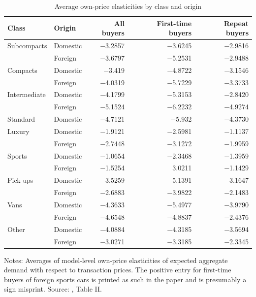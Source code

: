 \begin{table}[htbp]
\centering
\caption{Average own-price elasticities by class and origin}
\label{tab:08-gold-elas}
\footnotesize
\begin{tabular}{@{}llrrr@{}}
\toprule
Class & Origin & All buyers & First-time buyers & Repeat buyers \\
\midrule
Subcompacts & Domestic & $-$3.2857 & $-$3.6245 & $-$2.9816 \\
 & Foreign & $-$3.6797 & $-$5.2531 & $-$2.9488 \\
Compacts & Domestic & $-$3.419 & $-$4.8722 & $-$3.1546 \\
 & Foreign & $-$4.0319 & $-$5.7229 & $-$3.3733 \\
Intermediate & Domestic & $-$4.1799 & $-$5.3153 & $-$2.8420 \\
 & Foreign & $-$5.1524 & $-$6.2232 & $-$4.9274 \\
Standard & Domestic & $-$4.7121 & $-$5.932 & $-$4.3730 \\
Luxury & Domestic & $-$1.9121 & $-$2.5981 & $-$1.1137 \\
 & Foreign & $-$2.7448 & $-$3.1272 & $-$1.9959 \\
Sports & Domestic & $-$1.0654 & $-$2.3468 & $-$1.3959 \\
 & Foreign & $-$1.5254 & 3.0211 & $-$1.1429 \\
Pick-ups & Domestic & $-$3.5259 & $-$5.1391 & $-$3.1647 \\
 & Foreign & $-$2.6883 & $-$3.9822 & $-$2.1483 \\
Vans & Domestic & $-$4.3633 & $-$5.4977 & $-$3.9790 \\
 & Foreign & $-$4.6548 & $-$4.8837 & $-$2.4376 \\
Other & Domestic & $-$4.0884 & $-$4.3185 & $-$3.5694 \\
 & Foreign & $-$3.0271 & $-$3.3185 & $-$2.3345 \\
\bottomrule
\end{tabular}

\smallskip
\begin{minipage}{0.86\linewidth}
\footnotesize Notes: Averages of model-level own-price elasticities of expected aggregate demand with respect
to transaction prices. The positive entry for first-time buyers of foreign sports cars is printed as such in the
paper and is presumably a sign misprint. Source: \citet{Goldberg1995}, Table II.
\end{minipage}
\end{table}

